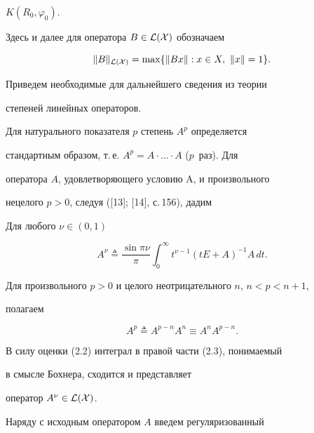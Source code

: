 $K(R_0,\varphi_0)$. 


Здесь и далее для оператора $B\in\cal L(X)$ обозначаем 


$$ 


\|B\|_{\cal L(X)}=\max\{\|B x\|:x\in X,\ \|x\|=1\}. 


$$ 


 


Приведем необходимые для дальнейшего сведения из теории 


степеней линейных операторов. 


Для натурального показателя $p$ степень $A^p$ определяется 


стандартным образом, т.\,е. $A^p=A\cdot\dotsc\cdot A$ ($p$~раз). Для 


оператора $A$, удовлетворяющего условию A, и произвольного 


нецелого $p>0$, следуя ([13]; [14], с.\,156), дадим 


 


\begin{defnnonum} 


Для любого $\nu\in(0,1)$ 


\begin{equation} 


A^\nu\triangleq\frac{\sin\pi\nu}{\pi} 


\int^\infty_0 t^{\nu-1}(t E+A)^{-1}A\,dt. 


\end{equation} 


Для произвольного $p>0$ и целого неотрицательного $n$, $n<p<n+1$, 


полагаем 


$$ 


A^p\triangleq A^{p-n}A^n\equiv A^n A^{p-n}. 


$$ 


\end{defnnonum} 


 


В силу оценки (2.2) интеграл в правой части (2.3), понимаемый 


в смысле Бохнера, сходится и представляет 


оператор $A^\nu\in\cal L(X)$. 


 


Наряду с исходным оператором $A$ введем регуляризованный 


